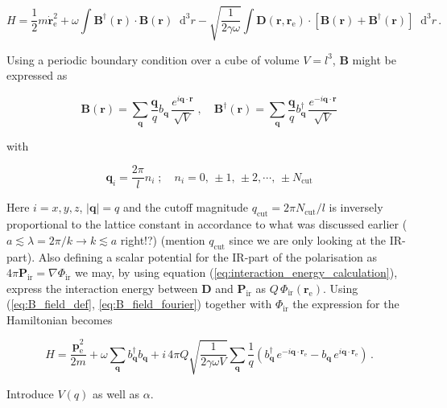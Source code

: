 \documentclass[12pt]{report}
\renewcommand{\vec}[1]{\boldsymbol{\mathbf{#1}}}                        %
\newcommand*\diff{\mathop{}\!\mathrm{d}}
\newcommand{\motivation}[1]{\textcolor{motivation}{#1}}
\newcommand{\todo}[1]{\textcolor{todo}{#1}}
\begin{document}
\begin{equation}
	H = \frac{1}{2} m \dot{\vec r}_\text{e}^2
	+ \omega \int \vec B^\dagger (\vec r) \cdot \vec B (\vec r) \diff^3 r
	- \sqrt{\frac{1}{2 \gamma \omega}} \int \vec D(\vec r, \vec r_\text{e}) \cdot \left[ \vec B(\vec r) +  \vec B^\dagger(\vec r) \right] \diff^3 r \,.
\end{equation}

Using a periodic boundary condition over a cube of volume $ V = l^3 $, $ \vec B $ might be expressed as

\begin{equation}
	\label{eq:B_field_fourier}
	\vec B (\vec r) = \sum_{\vec q} \frac{\vec q}{q} b_{\vec q} \, \frac{e^{i \vec q \cdot \vec r}}{\sqrt V}
	\; , \quad
	\vec B^\dagger (\vec r) = \sum_{\vec q} \frac{\vec q}{q} b^\dagger_{\vec q} \, \frac{e^{-i \vec q \cdot \vec r}}{\sqrt V}
\end{equation}

with

\begin{equation}
	\vec q_i = \frac{2\pi}{l} n_i
	\; ; \quad 
	n_i = 0, \, \pm 1, \, \pm 2, \cdots , \, \pm N_\text{cut}
\end{equation}

Here  $ i = x, y, z $, $ | \vec q | = q $ and the cutoff magnitude $ q_\text{cut} = 2 \pi N_\text{cut} / l $ is inversely proportional to the lattice constant in accordance to what was discussed earlier \motivation{($ a \lesssim \lambda = 2 \pi / k \rightarrow k \lesssim a $ right!?)} \todo{(mention $ q_\text{cut} $ since we are only looking at the IR-part)}. Also defining a scalar potential for the IR-part of the polarisation as $ 4 \pi \vec P_\text{ir} = \nabla \Phi_\text{ir} $ we may, by using equation (\ref{eq:interaction_energy_calculation}), express the interaction energy between $ \vec D $ and $ \vec P_\text{ir} $ as $ Q \, \Phi_\text{ir} (\vec r_\text{e}) $. Using (\ref{eq:B_field_def}, \ref{eq:B_field_fourier}) together with $ \Phi_\text{ir} $ the expression for the Hamiltonian becomes

\begin{equation}
	H = \frac{\vec p_\text{e}^2}{2m}
	+ \omega \sum_{\vec q} b^\dagger_{\vec q} b_{\vec q}
	+ i \, 4 \pi Q \sqrt{\frac{1}{2 \gamma \omega V}} \sum_{\vec q} \frac{1}{q} \left( b^\dagger_{\vec q} \, e^{-i \vec q \cdot \vec r_\text{e}} - b_{\vec q} \, e^{i \vec q \cdot \vec r_\text{e}} \right) \,.
\end{equation}

\todo{Introduce $ V(q) $ as well as $ \alpha $.}
\end{document}
